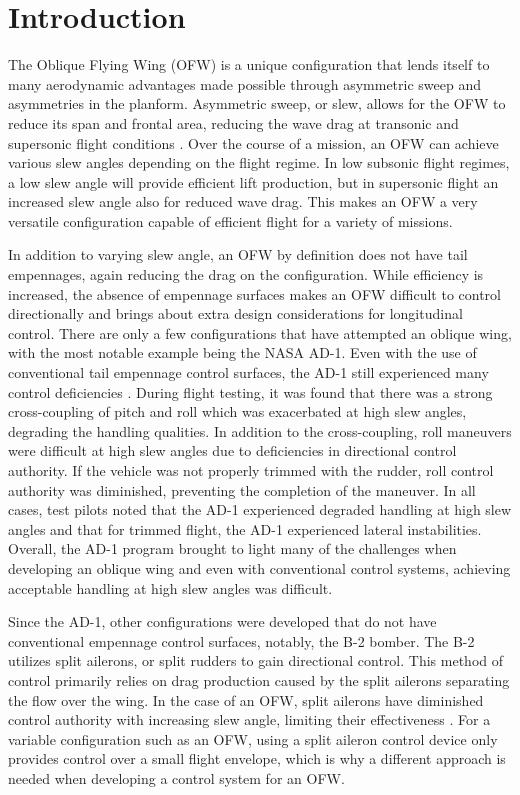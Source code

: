 \section{Introduction}

The Oblique Flying Wing (OFW) is a unique configuration that lends itself to many aerodynamic advantages made possible through asymmetric sweep and asymmetries in the planform.
Asymmetric sweep, or slew, allows for the OFW to reduce its span and frontal area, reducing the wave drag at transonic and supersonic flight conditions \cite{jones1977oblique, jones1972reduction}.
Over the course of a mission, an OFW can achieve various slew angles depending on the flight regime.
In low subsonic flight regimes, a low slew angle will provide efficient lift production, but in supersonic flight an increased slew angle also for reduced wave drag.
This makes an OFW a very versatile configuration capable of efficient flight for a variety of missions.

In addition to varying slew angle, an OFW by definition does not have tail empennages, again reducing the drag on the configuration.
While efficiency is increased, the absence of empennage surfaces makes an OFW difficult to control directionally and brings about extra design considerations for longitudinal control.
There are only a few configurations that have attempted an oblique wing, with the most notable example being the NASA AD-1.
Even with the use of conventional tail empennage control surfaces, the AD-1 still experienced many control deficiencies \cite{nasaAD_1}.
During flight testing, it was found that there was a strong cross-coupling of pitch and roll which was exacerbated at high slew angles, degrading the handling qualities.
In addition to the cross-coupling, roll maneuvers were difficult at high slew angles due to deficiencies in directional control authority.
If the vehicle was not properly trimmed with the rudder, roll control authority was diminished, preventing the completion of the maneuver.
In all cases, test pilots noted that the AD-1 experienced degraded handling at high slew angles and that for trimmed flight, the AD-1 experienced lateral instabilities.
Overall, the AD-1 program brought to light many of the challenges when developing an oblique wing and even with conventional control systems, achieving acceptable handling at high slew angles was difficult.

Since the AD-1, other configurations were developed that do not have conventional empennage control surfaces, notably, the B-2 bomber.
The B-2 utilizes split ailerons, or split rudders to gain directional control.
This method of control primarily relies on drag production caused by the split ailerons separating the flow over the wing.
In the case of an OFW, split ailerons have diminished control authority with increasing slew angle, limiting their effectiveness \cite{desktop_aero}.
For a variable configuration such as an OFW, using a split aileron control device only provides control over a small flight envelope, which is why a different approach is needed when developing a control system for an OFW.

